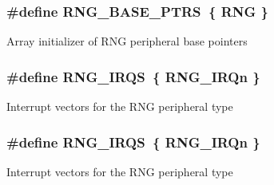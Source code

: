\subsubsection[{\texorpdfstring{R\+N\+G\+\_\+\+B\+A\+S\+E\+\_\+\+P\+T\+RS}{RNG_BASE_PTRS}}]{\setlength{\rightskip}{0pt plus 5cm}\#define R\+N\+G\+\_\+\+B\+A\+S\+E\+\_\+\+P\+T\+RS~\{ {\bf R\+NG} \}}\hypertarget{group__RNG__Peripheral__Access__Layer_gafe29fd84164c78d03c9a7a2128caf361}{}\label{group__RNG__Peripheral__Access__Layer_gafe29fd84164c78d03c9a7a2128caf361}
Array initializer of R\+NG peripheral base pointers 
\subsubsection[{\texorpdfstring{R\+N\+G\+\_\+\+I\+R\+QS}{RNG_IRQS}}]{\setlength{\rightskip}{0pt plus 5cm}\#define R\+N\+G\+\_\+\+I\+R\+QS~\{ {\bf R\+N\+G\+\_\+\+I\+R\+Qn} \}}\hypertarget{group__RNG__Peripheral__Access__Layer_ga2ad5ec19e225454d775bec0771e14615}{}\label{group__RNG__Peripheral__Access__Layer_ga2ad5ec19e225454d775bec0771e14615}
Interrupt vectors for the R\+NG peripheral type 
\subsubsection[{\texorpdfstring{R\+N\+G\+\_\+\+I\+R\+QS}{RNG_IRQS}}]{\setlength{\rightskip}{0pt plus 5cm}\#define R\+N\+G\+\_\+\+I\+R\+QS~\{ {\bf R\+N\+G\+\_\+\+I\+R\+Qn} \}}\hypertarget{group__RNG__Peripheral__Access__Layer_ga2ad5ec19e225454d775bec0771e14615}{}\label{group__RNG__Peripheral__Access__Layer_ga2ad5ec19e225454d775bec0771e14615}
Interrupt vectors for the R\+NG peripheral type 
